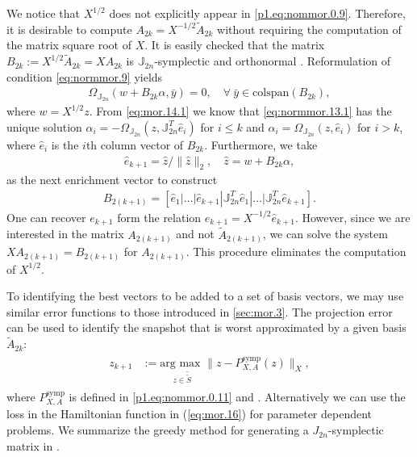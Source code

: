 We notice that $X^{1/2}$ does not explicitly appear in \eqref{p1.eq:nommor.0.9}. Therefore, it is desirable to compute $A_{2k} = X^{-1/2} \tilde A_{2k}$ without requiring the computation of the matrix square root of $X$. It is easily checked that the matrix $B_{2k}:=X^{1/2} \tilde A_{2k} = XA_{2k}$ is $\mathbb J_{2n}$-symplectic and orthonormal . Reformulation of condition \cref{eq:normmor.9} yields
\begin{eqnarray} \label{eq:normmor.13.1}
	\Omega_{\mathbb J_{2n}}\left( w + B_{2k} \alpha, \bar y \right) = 0, \quad \forall~ \bar y \in \text{colspan}(B_{2k}),
\end{eqnarray}
where $w = X^{1/2}z$. From \cref{eq:mor.14.1} we know that \cref{eq:normmor.13.1} has the unique solution $\alpha_i = - \Omega_{\mathbb J_{2n}}(z,\mathbb J_{2n}^T \hat e_i)$ for $i\leq k$ and $\alpha_i = \Omega_{\mathbb J_{2n}}(z,\hat e_i)$ for $i>k$, where $\hat e_i$ is the $i$th column vector of $B_{2k}$. Furthermore, we take 
\begin{eqnarray}
	\hat e_{k+1} = \hat z / \| \hat z \|_2, \quad \hat z = w + B_{2k} \alpha,
\end{eqnarray}
as the next enrichment vector to construct
\begin{eqnarray}
	B_{2(k+1)} = [ \hat e_1 | \dots | \hat e_{k+1} | \mathbb J_{2n}^T \hat e_1 | \dots | \mathbb J_{2n}^T \hat e_{k+1} ].
\end{eqnarray}
One can recover $e_{k+1}$ form the relation $e_{k+1} = X^{-1/2} \hat e_{k+1}$. However, since we are interested in the matrix $A_{2(k+1)}$ and not $\tilde A_{2(k+1)}$, we can solve the system $XA_{2(k+1)} = B_{2(k+1)}$ for $A_{2(k+1)}$. This procedure eliminates the computation of $X^{1/2}$.

To identifying the best vectors to be added to a set of basis vectors, we may use similar error functions to those introduced in \cref{sec:mor.3}. The projection error can be used to identify the snapshot that is worst approximated by a given basis $\tilde A_{2k}$:
\begin{eqnarray} \label{eq:normmor.14}
\begin{aligned}
	z_{k+1} &:= \underset{z\in \tilde{\tilde{S}}}{\text{arg\ max } }\| z - P_{X,A}^{\text{symp}}(z) \|_X,
\end{aligned}
\end{eqnarray}
where $P_{X,A}^{\text{symp}}$ is defined in \eqref{p1.eq:nommor.0.11} and . Alternatively we can use the loss in the Hamiltonian function in (\ref{eq:mor.16}) for parameter dependent problems. We summarize the greedy method for generating a $J_{2n}$-symplectic matrix in .

